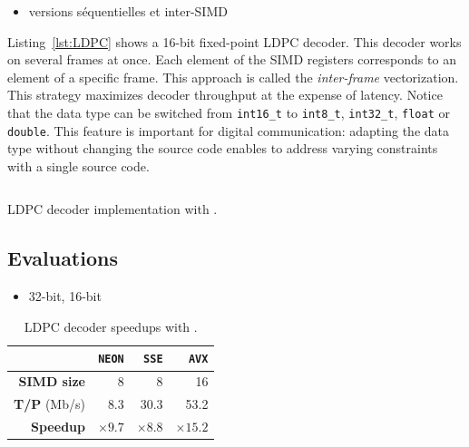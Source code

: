 \begin{itemize}
  \item versions séquentielles et inter-SIMD
\end{itemize}

Listing~\ref{lst:LDPC} shows a 16-bit fixed-point LDPC decoder. This decoder
works on several frames at once. Each element of the SIMD registers corresponds
to an element of a specific frame. This approach is called the
\textit{inter-frame} vectorization. This strategy maximizes decoder throughput
at the expense of latency. Notice that the data type can be switched from
\verb|int16_t| to \verb|int8_t|, \verb|int32_t|, \verb|float| or \verb|double|.
This \MIPP feature is important for digital communication: adapting the data
type without changing the source code enables to address varying constraints
with a single source code.

\begin{listing}
  \inputminted[frame=lines,linenos]{C++}{main/chapter2/src/ldpc/bp_min_sum.cpp}
  \caption{LDPC decoder implementation with \MIPP.}
  \label{lst:LDPC}
\end{listing}

\subsection{Evaluations}

\begin{itemize}
  \item 32-bit, 16-bit
\end{itemize}

\begin{table}
  \tabcolsep=6pt
  \centering
  \caption{LDPC decoder speedups with \MIPP.}
  \label{tab:ldpc_speedups}
  \begin{tabular}{r|r|r|r}
                      & \textbf{\texttt{NEON}} & \textbf{\texttt{SSE}} & \textbf{\texttt{AVX}} \\ \hline
  \textbf{SIMD size}  & 8                      & 8                     & 16                    \\ \hline
  \textbf{T/P} (Mb/s) & 8.3                    & 30.3                  & 53.2                  \\ \hline
  \textbf{Speedup}    & $\times 9.7$           & $\times 8.8$          & $\times 15.2$         \\
  \end{tabular}
\end{table}

